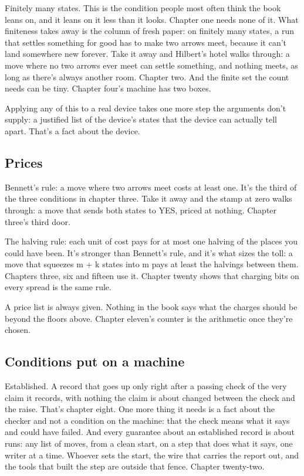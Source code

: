 \documentclass[11pt,twoside]{article}
\theoremstyle{thielethm}
\theoremstyle{thieledef}
\theoremstyle{thieledef}
\theoremstyle{thieledef}
\theoremstyle{thielethm}
\theoremstyle{thieleobs}
\theoremstyle{thielethm}
\begin{document}
Finitely many states. This is the condition people most often think the book leans on, and it leans on it less than it looks. Chapter one needs none of it. What finiteness takes away is the column of fresh paper: on finitely many states, a run that settles something for good has to make two arrows meet, because it can't land somewhere new forever. Take it away and Hilbert's hotel walks through: a move where no two arrows ever meet can settle something, and nothing meets, as long as there's always another room. Chapter two. And the finite set the count needs can be tiny. Chapter four's machine has two boxes.

Applying any of this to a real device takes one more step the arguments don't supply: a justified list of the device's states that the device can actually tell apart. That's a fact about the device.

\subsection{Prices}

Bennett's rule: a move where two arrows meet costs at least one. It's the third of the three conditions in chapter three. Take it away and the stamp at zero walks through: a move that sends both states to YES, priced at nothing. Chapter three's third door.

The halving rule: each unit of cost pays for at most one halving of the places you could have been. It's stronger than Bennett's rule, and it's what sizes the toll: a move that squeezes m + k states into m pays at least the halvings between them. Chapters three, six and fifteen use it. Chapter twenty shows that charging bits on every spread is the same rule.

A price list is always given. Nothing in the book says what the charges should be beyond the floors above. Chapter eleven's counter is the arithmetic once they're chosen.

\subsection{Conditions put on a machine}

Established. A record that goes up only right after a passing check of the very claim it records, with nothing the claim is about changed between the check and the raise. That's chapter eight. One more thing it needs is a fact about the checker and not a condition on the machine: that the check means what it says and could have failed. And every guarantee about an established record is about runs: any list of moves, from a clean start, on a step that does what it says, one writer at a time. Whoever sets the start, the wire that carries the report out, and the tools that built the step are outside that fence. Chapter twenty-two.
\end{document}
